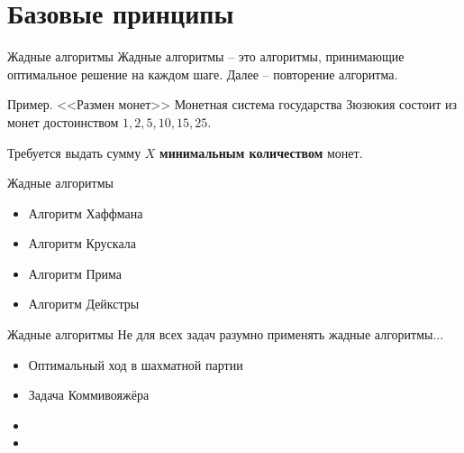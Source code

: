 \section{Базовые принципы}\label{section:base_principles}

\begin{frame}{Жадные алгоритмы}
	Жадные алгоритмы -- это алгоритмы, принимающие оптимальное решение на каждом шаге. Далее -- повторение алгоритма.
	
	\begin{block}{Пример. <<Размен монет>>}
		Монетная система государства Зюзюкия состоит из монет достоинством
		$1, 2, 5, 10, 15, 25$.
		
		Требуется выдать сумму $X$ \textbf{минимальным количеством} монет.
	\end{block}	
	
\end{frame}

\begin{frame}{Жадные алгоритмы}
	\begin{itemize}
		\item Алгоритм Хаффмана
		\item Алгоритм Крускала 
		\item Алгоритм Прима 
		\item Алгоритм Дейкстры
	\end{itemize}
\end{frame}


\begin{frame}{Жадные алгоритмы}
	Не для всех задач разумно применять жадные алгоритмы...
	
	
	\begin{itemize}
		\item Оптимальный ход в шахматной партии
		\item Задача Коммивояжёра
		\item {}
		\item {}
	\end{itemize}
\end{frame}







